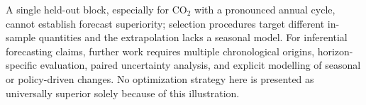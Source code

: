 A single held-out block, especially for CO$_2$ with
a pronounced annual cycle, cannot establish forecast
superiority; selection procedures target different
in-sample quantities and the extrapolation lacks a
seasonal model. For inferential forecasting claims,
further work requires multiple chronological origins,
horizon-specific evaluation, paired uncertainty
analysis, and explicit modelling of seasonal or
policy-driven changes. No optimization strategy here
is presented as universally superior solely because
of this illustration.
